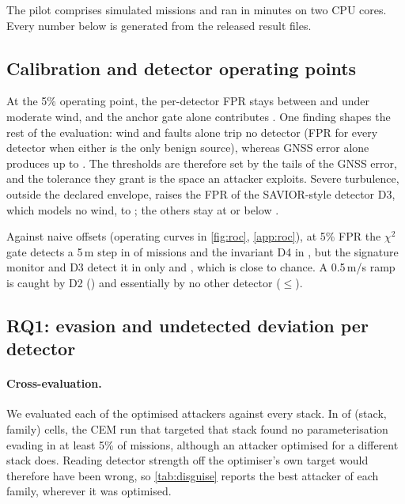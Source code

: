 
The pilot comprises \nMissionsTotal{} simulated missions and ran in
\nWallMin{} minutes on two CPU cores. Every number below is generated from the
released result files.

\subsection{Calibration and detector operating points}
At the 5\% operating point, the per-detector FPR stays between \nFprModMin{}
and \nFprModMax{} under moderate wind, and the anchor gate alone contributes
\nFprAnchor. One finding shapes the rest of the evaluation: wind and faults
alone trip no detector (FPR \nFprWindFaultMax{} for every detector when either
is the only benign source), whereas GNSS error alone produces up to
\nFprGnssOnlyMax{}. The thresholds are therefore set by the tails of the GNSS
error, and the tolerance they grant is the space an attacker exploits. Severe
turbulence, outside the declared envelope, raises the FPR of the SAVIOR-style
detector D3, which models no wind, to \nFprSevereDThree{}; the others stay at or
below \nFprSevereOtherMax{}.

Against naive offsets (operating curves in \cref{fig:roc}, \cref{app:roc}), at 5\% FPR the
$\chi^2$ gate detects a 5\,m step in \nTprStepDTwo{} of missions and the
invariant D4 in \nTprStepDFour{}, but the signature monitor and D3 detect it in
only \nTprStepDOne{} and \nTprStepDThree{}, which is close to chance. A 0.5\,m/s
ramp is caught by D2 (\nTprRampDTwo{}) and essentially by no other detector
($\le$\nTprRampDThree{}).


\subsection{RQ1: evasion and undetected deviation per detector}
\paragraph{Cross-evaluation.}
We evaluated each of the \nPooledAttackers{} optimised attackers against every
stack. In \nOwnOptFail{} of \nCells{} (stack, family) cells, the CEM run that
targeted that stack found no parameterisation evading in at least 5\% of
missions, although an attacker optimised for a different stack does. Reading detector strength off the
optimiser's own target would therefore have been wrong, so
\cref{tab:disguise} reports the best attacker of each family, wherever it was
optimised.

